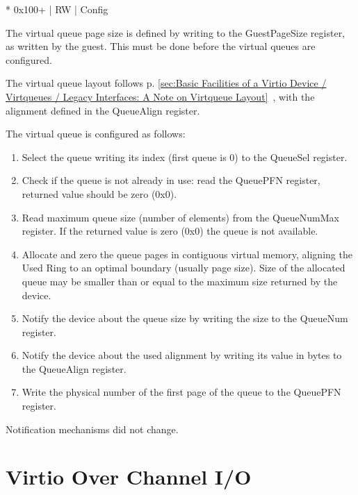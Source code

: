 * 0x100+ | RW | Config

The virtual queue page size is defined by writing to the GuestPageSize
register, as written by the guest. This must be done before the
virtual queues are configured.

The virtual queue layout follows
p. \ref{sec:Basic Facilities of a Virtio Device / Virtqueues / Legacy Interfaces: A Note on Virtqueue Layout}~,
with the alignment defined in the QueueAlign register.

The virtual queue is configured as follows:
\begin{enumerate}
\item Select the queue writing its index (first queue is 0) to the
   QueueSel register.

\item Check if the queue is not already in use: read the QueuePFN
   register, returned value should be zero (0x0).

\item Read maximum queue size (number of elements) from the
   QueueNumMax register. If the returned value is zero (0x0) the
   queue is not available.

\item Allocate and zero the queue pages in contiguous virtual
   memory, aligning the Used Ring to an optimal boundary (usually
   page size). Size of the allocated queue may be smaller than or
   equal to the maximum size returned by the device.

\item Notify the device about the queue size by writing the size to
   the QueueNum register.

\item Notify the device about the used alignment by writing its value
   in bytes to the QueueAlign register.

\item Write the physical number of the first page of the queue to
   the QueuePFN register.
\end{enumerate}

Notification mechanisms did not change.

\section{Virtio Over Channel I/O}\label{sec:Virtio Transport Options / Virtio Over Channel I/O}

